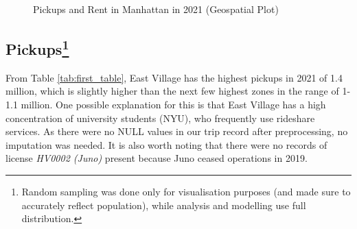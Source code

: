 \documentclass[11pt]{article}
\begin{document}
\begin{figure}[h]%
    \centering
    \qquad

    \caption{Pickups and Rent in Manhattan in 2021 (Geospatial Plot) }

\end{figure}



\subsection{Pickups\footnote{Random sampling was done only for visualisation purposes (and made sure to accurately reflect population), while analysis and modelling use full distribution.}}
From Table \ref{tab:first_table}, East Village has the highest pickups in 2021 of 1.4 million, which is slightly higher than the next few highest zones in the range of 1-1.1 million. One possible explanation for this is that East Village has a high concentration of university students (NYU), who frequently use rideshare services. As there were no NULL values in our trip record after preprocessing, no imputation was needed. It is also worth noting that there were no records of license \textit{HV0002 (Juno)} present because Juno ceased operations in 2019\cite{juno}. 
\end{document}
